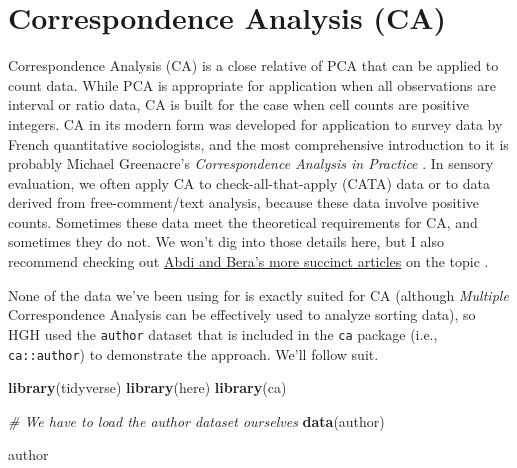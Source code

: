 \documentclass[
]{book}
\newenvironment{Shaded}{\begin{snugshade}}{\end{snugshade}}
\newcommand{\CommentTok}[1]{\textcolor[rgb]{0.56,0.35,0.01}{\textit{#1}}}
\newcommand{\FunctionTok}[1]{\textcolor[rgb]{0.13,0.29,0.53}{\textbf{#1}}}
\newcommand{\NormalTok}[1]{#1}
\begin{document}
\chapter{Correspondence Analysis (CA)}\label{correspondence-analysis-ca}

Correspondence Analysis (CA) is a close relative of PCA that can be applied to count data. While PCA is appropriate for application when all observations are interval or ratio data, CA is built for the case when cell counts are positive integers. CA in its modern form was developed for application to survey data by French quantitative sociologists, and the most comprehensive introduction to it is probably Michael Greenacre's \emph{Correspondence Analysis in Practice} \citeyearpar{greenacre2017correspondence}. In sensory evaluation, we often apply CA to check-all-that-apply (CATA) data or to data derived from free-comment/text analysis, because these data involve positive counts. Sometimes these data meet the theoretical requirements for CA, and sometimes they do not. We won't dig into those details here, but I also recommend checking out \href{https://personal.utdallas.edu/~herve/abdi-AB2014_CA.pdf}{Abdi and Bera's more succinct articles} on the topic \citeyearpar{abdiCorrespondence}.

None of the data we've been using for is exactly suited for CA (although \emph{Multiple} Correspondence Analysis can be effectively used to analyze sorting data), so HGH used the \texttt{author} dataset that is included in the \texttt{ca} package (i.e., \texttt{ca::author}) to demonstrate the approach. We'll follow suit.

\begin{Shaded}
\begin{Highlighting}[]
\FunctionTok{library}\NormalTok{(tidyverse)}
\FunctionTok{library}\NormalTok{(here)}
\FunctionTok{library}\NormalTok{(ca)}

\CommentTok{\# We have to load the \textasciigrave{}author\textasciigrave{} dataset ourselves}
\FunctionTok{data}\NormalTok{(author)}

\NormalTok{author}
\end{Highlighting}
\end{Shaded}
\end{document}
